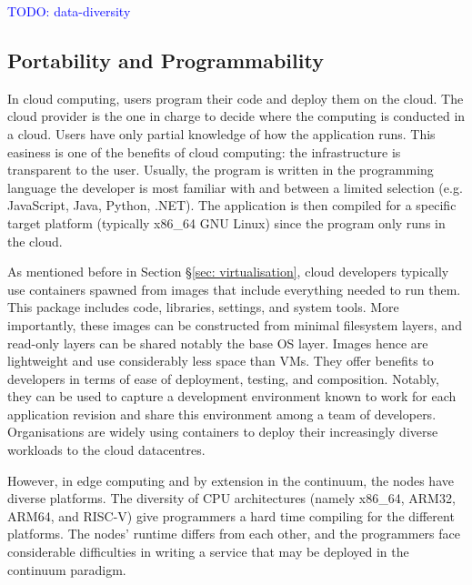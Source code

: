 \textcolor{blue}{TODO: data-diversity}

\subsection{Portability and Programmability}

In cloud computing, users program their code and deploy them on the cloud. The cloud provider is the one in charge to decide where the computing is conducted in a cloud. Users have only partial knowledge of how the application runs. This easiness is one of the benefits of cloud computing: the infrastructure is transparent to the user. Usually, the program is written in the programming language the developer is most familiar with and between a limited selection (e.g. JavaScript, Java, Python, .NET). The application is then compiled for a specific target platform (typically x86\_64 GNU Linux) since the program only runs in the cloud.

As mentioned before in Section §\ref{sec: virtualisation}, cloud developers typically use containers spawned from images that include everything needed to run them. This package includes code, libraries, settings, and system tools. More importantly, these images can be constructed from minimal filesystem layers, and read-only layers can be shared notably the base OS layer. Images hence are lightweight and use considerably less space than VMs. They offer benefits to developers in terms of ease of deployment, testing, and composition. Notably, they can be used to capture a development environment known to work for each application revision and share this environment among a team of developers. Organisations are widely using containers to deploy their increasingly diverse workloads to the cloud datacentres.

However, in edge computing and by extension in the continuum, the nodes have diverse platforms. The diversity of CPU architectures (namely x86\_64, ARM32, ARM64, and RISC-V) give programmers a hard time compiling for the different platforms. The nodes' runtime differs from each other, and the programmers face considerable difficulties in writing a service that may be deployed in the continuum paradigm.

